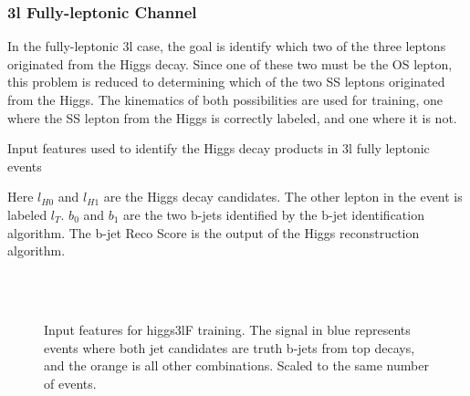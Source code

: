 \subsubsection{3l Fully-leptonic Channel}
\label{subsec:higgs3lF}

In the fully-leptonic 3l case, the goal is identify which two of the three leptons originated from the Higgs decay. Since one of these two must be the OS lepton, this problem is reduced to determining which of the two SS leptons originated from the Higgs. The kinematics of both possibilities are used for training, one where the SS lepton from the Higgs is correctly labeled, and one where it is not.

\begin{table}[H]

  \caption{Input features used to identify the Higgs decay products in 3l fully leptonic events}
  \label{tab:higgsTop3lFfeatures}
\end{table}

Here $l_{H0}$ and $l_{H1}$ are the Higgs decay candidates. The other lepton in the event is labeled $l_T$. $b_0$ and $b_1$ are the two b-jets identified by the b-jet identification algorithm. The b-jet Reco Score is the output of the Higgs reconstruction algorithm. 

\begin{figure}[H]
    \centering
    \\
    \\
    \caption{Input features for higgs3lF training. The signal in blue represents events where both jet candidates are truth b-jets from top decays, and the orange is all other combinations. Scaled to the same number of events.}
    \label{fig:features_higgs3lF}
\end{figure}

